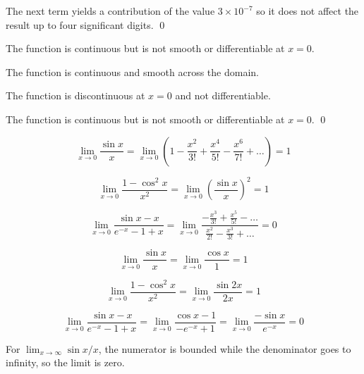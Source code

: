 \documentclass[12pt]{article}
\begin{document}
The next term yields a contribution of the value $3 \times 10^{-7}$ so it does not affect the result up to four significant digits.
\qed



The function is continuous but is not smooth or differentiable at $x = 0$.

The function is continuous and smooth across the domain.

The function is discontinuous at $x = 0$ and not differentiable.

The function is continuous but is not smooth or differentiable at $x = 0$.
\qed




\begin{equation}
    \lim_{x \to 0} \frac{\sin{x}}{x} = \lim_{x \to 0} \left( 1 - \frac{x^{2}}{3!} + \frac{x^{4}}{5!} - \frac{x^{6}}{7!} + \dots \right) = 1
\end{equation}

\begin{equation}
    \lim_{x \to 0} \frac{1 - \cos^{2}{x}}{x^{2}} = \lim_{x \to 0} \left( \frac{\sin{x}}{x} \right)^{2} = 1
\end{equation}

\begin{equation}
    \lim_{x \to 0} \frac{\sin{x} - x}{e^{-x} - 1 + x} = \lim_{x \to 0} \frac{-\frac{x^{3}}{3!} + \frac{x^{5}}{5!} - \dots}{\frac{x^{2}}{2!} - \frac{x^{3}}{3!} + \dots} = 0
\end{equation}


\begin{equation}
    \lim_{x \to 0} \frac{\sin{x}}{x} = \lim_{x \to 0} \frac{\cos{x}}{1} = 1
\end{equation}

\begin{equation}
    \lim_{x \to 0} \frac{1 - \cos^{2}{x}}{x^{2}} = \lim_{x \to 0} \frac{\sin{2x}}{2x} = 1
\end{equation}

\begin{equation}
    \lim_{x \to 0} \frac{\sin{x} - x}{e^{-x} - 1 + x} = \lim_{x \to 0} \frac{\cos{x} - 1}{-e^{-x} + 1} = \lim_{x \to 0} \frac{-\sin{x}}{e^{-x}} = 0
\end{equation}

For $\lim_{x \to \infty} \sin{x}/x$, the numerator is bounded while the denominator goes to infinity, so the limit is zero.
\end{document}
